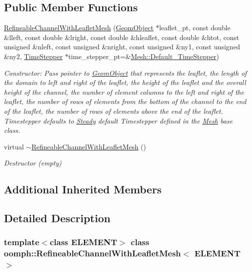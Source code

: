 \subsection*{Public Member Functions}
\begin{DoxyCompactItemize}
\item 
\hyperlink{classoomph_1_1RefineableChannelWithLeafletMesh_a9af91f13b3fd683029e2bdfbfe3abd66}{Refineable\+Channel\+With\+Leaflet\+Mesh} (\hyperlink{classoomph_1_1GeomObject}{Geom\+Object} $\ast$leaflet\+\_\+pt, const double \&lleft, const double \&lright, const double \&hleaflet, const double \&htot, const unsigned \&nleft, const unsigned \&nright, const unsigned \&ny1, const unsigned \&ny2, \hyperlink{classoomph_1_1TimeStepper}{Time\+Stepper} $\ast$time\+\_\+stepper\+\_\+pt=\&\hyperlink{classoomph_1_1Mesh_a12243d0fee2b1fcee729ee5a4777ea10}{Mesh\+::\+Default\+\_\+\+Time\+Stepper})
\begin{DoxyCompactList}\small\item\em Constructor\+: Pass pointer to \hyperlink{classoomph_1_1GeomObject}{Geom\+Object} that represents the leaflet, the length of the domain to left and right of the leaflet, the height of the leaflet and the overall height of the channel, the number of element columns to the left and right of the leaflet, the number of rows of elements from the bottom of the channel to the end of the leaflet, the number of rows of elements above the end of the leaflet. Timestepper defaults to \hyperlink{classoomph_1_1Steady}{Steady} default Timestepper defined in the \hyperlink{classoomph_1_1Mesh}{Mesh} base class. \end{DoxyCompactList}\item 
virtual \hyperlink{classoomph_1_1RefineableChannelWithLeafletMesh_aed441c6ae7a9078b649d733a033bd2b5}{$\sim$\+Refineable\+Channel\+With\+Leaflet\+Mesh} ()
\begin{DoxyCompactList}\small\item\em Destructor (empty) \end{DoxyCompactList}\end{DoxyCompactItemize}
\subsection*{Additional Inherited Members}


\subsection{Detailed Description}
\subsubsection*{template$<$class E\+L\+E\+M\+E\+NT$>$\newline
class oomph\+::\+Refineable\+Channel\+With\+Leaflet\+Mesh$<$ E\+L\+E\+M\+E\+N\+T $>$}

